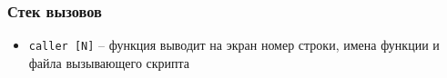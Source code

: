 \begin{frame}[fragile]
	\frametitle{Стек вызовов}

	\begin{itemize}
		\item {\tt caller [N]} -- функция выводит на экран номер строки, имена функции и файла вызывающего скрипта
	\end{itemize}

         

\end{frame}
